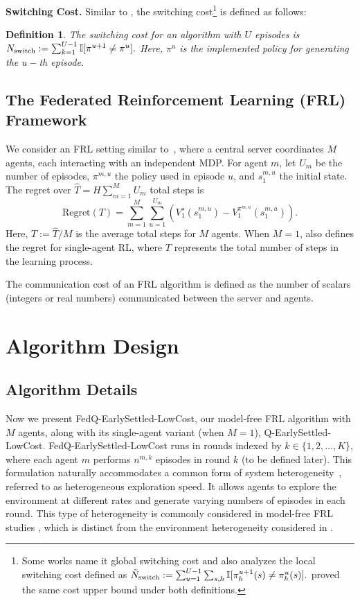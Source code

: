 \documentclass{article}
\newtheorem{definition}[theorem]{Definition}
\begin{document}
\textbf{Switching Cost.} Similar to \cite{qiao2022sample}, the switching cost\footnote{Some works name it global switching cost and also analyzes the local switching cost defined as $\tilde{N}_\textnormal{switch} := \sum_{u=1}^{U-1} \sum_{s,h}\mathbb{I}[\pi^{u+1}_h(s) \neq \pi^{u}_h(s)].$ \cite{bai2019provably,zhang2020almost} proved the same cost upper bound under both definitions.} is defined as follows:
\begin{definition}\label{def_switching}
The switching cost for an algorithm with $U$ episodes is $N_\textnormal{switch} := \sum_{k=1}^{U-1} \mathbb{I}[\pi^{u+1} \neq \pi^{u}].$ Here, $\pi^u$ is the implemented policy for generating the $u-$th episode.
\end{definition}
\subsection{The Federated Reinforcement Learning (FRL) Framework}
We consider an FRL setting similar to~\cite{zheng2023federated, zheng2024federated}, where a central server coordinates \( M \) agents, each interacting with an independent MDP. For agent \( m \), let \( U_m \) be the number of episodes, \( \pi^{m,u} \) the policy used in episode \( u \), and \( s_1^{m,u} \) the initial state. The regret over $\hat{T}=H\sum_{m=1}^M U_m$ total steps is
\begin{equation}\label{def_regret_add}
    \mbox{Regret}(T) = \sum_{m =1}^M \sum_{u=1}^{U_m} \left(V_1^\star(s_1^{m,u}) - V_1^{\pi^{m,u}}(s_1^{m,u})\right).
\end{equation}
Here, $T:=\hat{T}/M$ is the average total steps for $M$ agents. When $M=1$,  also defines the regret for single-agent RL, where $T$ represents the total number of steps in the learning process.

The communication cost of an FRL algorithm is defined as the number of scalars (integers or real numbers) communicated between the server and agents.




\section{Algorithm Design}
\subsection{Algorithm Details}\label{sec:alg}
Now we present FedQ-EarlySettled-LowCost, our model-free FRL algorithm with $M$ agents, along with its single-agent variant (when $M=1$), Q-EarlySettled-LowCost. FedQ-EarlySettled-LowCost runs in rounds indexed by $k\in\{1,2,...,K\}$, where each agent $m$ performs $n^{m,k}$ episodes in round $k$ (to be defined later). This formulation naturally accommodates a common form of system heterogeneity~\cite{li2020federated3}, referred to as heterogeneous exploration speed. It allows agents to explore the environment at different rates and generate varying numbers of episodes in each round. This type of heterogeneity is commonly considered in model-free FRL studies \cite{zheng2023federated, zheng2024federated}, which is distinct from the environment heterogeneity considered in \cite{labbi2024federated}.
\end{document}
